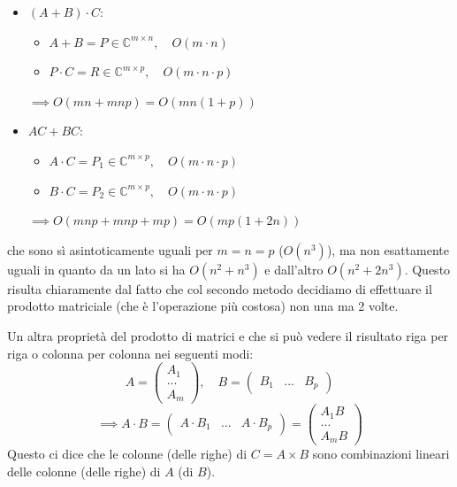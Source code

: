 \documentclass[a4paper,11pt]{article}
\begin{document}
\begin{itemize}
	\item $(A + B) \cdot C$:
		\begin{itemize}
			\item $A + B = P \in \mathbb{C}^{m \times n}, \quad O(m\cdot n)$
			\item $P \cdot C = R \in \mathbb{C}^{m \times p}, \quad O(m \cdot n \cdot p)$
		\end{itemize}
		$
		\implies O(mn + mnp) = O\left( mn(1 + p) \right)
		$
	\item $AC + BC$:
		\begin{itemize}
			\item $A \cdot C = P_1 \in \mathbb{C}^{m \times p}, \quad O(m \cdot n \cdot p)$
			\item $B \cdot C = P_2 \in \mathbb{C}^{m \times p}, \quad O(m \cdot n \cdot p)$
		\end{itemize}
		$
		\implies O(mnp + mnp + mp) = O\left( mp(1 + 2n) \right)
		$
\end{itemize}
che sono sì asintoticamente uguali per $m = n = p$ ($O(n^3)$),  ma non esattamente uguali in quanto da un lato si ha $O(n^2 + n^3)$ e dall'altro $O(n^2 + 2 n^3)$.
Questo risulta chiaramente dal fatto che col secondo metodo decidiamo di effettuare il prodotto matriciale (che è l'operazione più costosa) non una ma 2 volte.

\par\medskip

Un altra proprietà del prodotto di matrici e che si può vedere il risultato riga per riga o colonna per colonna nei seguenti modi:
$$
A = \begin{pmatrix}
A_1 \\
... \\ 
A_m
\end{pmatrix}, \quad
B = \begin{pmatrix}
	B_1 & ... & B_p
\end{pmatrix}
$$
$$
\implies
A \cdot B = \begin{pmatrix}
	A \cdot B_1 & ... & A \cdot B_p
\end{pmatrix} = \begin{pmatrix}
A_1 B \\ ... \\ A_m B
\end{pmatrix}
$$
Questo ci dice che le colonne (delle righe) di $C = A \times B$ sono combinazioni lineari delle colonne (delle righe) di $A$ (di $B$).
\end{document}
